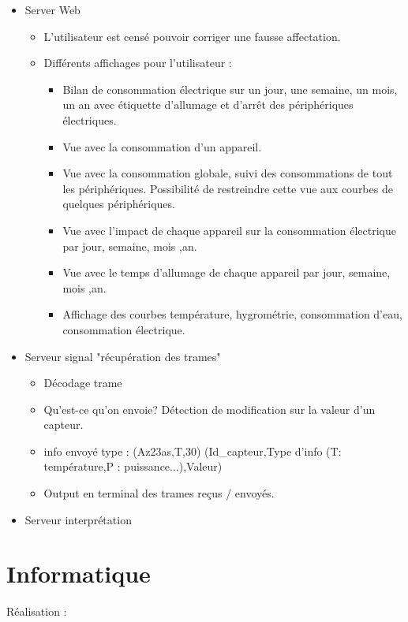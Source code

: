 \documentclass[10pt,a4paper]{article}
\begin{document}
\begin{itemize}
\item Server Web
\begin{itemize}
\item L'utilisateur est censé pouvoir corriger une fausse affectation.
\item Différents affichages pour l'utilisateur :
\begin{itemize}
  \item Bilan de consommation électrique sur un jour, une semaine, un mois, un an avec étiquette d'allumage et d'arrêt des périphériques électriques.
  \item Vue avec la consommation d'un appareil.
  \item Vue avec la consommation globale, suivi des consommations de tout les périphériques. Possibilité de restreindre cette vue aux courbes de quelques périphériques.
  \item Vue avec l'impact de chaque appareil sur la consommation électrique par jour, semaine, mois ,an.
  \item Vue avec le temps d'allumage de chaque appareil par jour, semaine, mois ,an.
  \item Affichage des courbes température, hygrométrie, consommation d'eau, consommation électrique.
\end{itemize}
\end{itemize}
\end{itemize}

\begin{itemize}
\item Serveur signal "récupération des trames"
\begin{itemize}
\item Décodage trame
\item Qu'est-ce qu'on envoie? Détection de modification sur la valeur d'un capteur.
\item info envoyé type : (Az23as,T,30) (Id\_capteur,Type d'info (T: température,P : puissance...),Valeur)
\item Output en terminal des trames reçus / envoyés.
\end{itemize}
\end{itemize}

\begin{itemize}
\item Serveur interprétation
\end{itemize}

\section{Informatique}
Réalisation :
\end{document}

